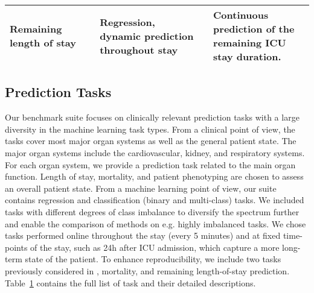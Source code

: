 \documentclass{article}
\begin{document}
\begin{table}[!hb]
\begin{tabular}{lll}
    Remaining length of stay & \makecell[l]{Regression, \\dynamic prediction throughout stay} & \makecell[l]{Continuous prediction of the \\ remaining ICU stay duration.}      \\
    \bottomrule
  \end{tabular}\label{tab:tasks}
\end{table}
\endgroup

\subsection{Prediction Tasks}\label{tasks}

Our benchmark suite focuses on clinically relevant prediction tasks with a large diversity in the machine learning task types. From a clinical point of view, the tasks cover most major organ systems as well as the general patient state. The major organ systems include the cardiovascular, kidney, and respiratory systems. For each organ system, we provide a prediction task related to the main organ function.
Length of stay, mortality, and patient phenotyping are chosen to assess an overall patient state.
From a machine learning point of view, our suite contains regression and classification (binary and multi-class) tasks. We included tasks with different degrees of class imbalance to diversify the spectrum further and enable the comparison of methods on e.g. highly imbalanced tasks. We chose tasks performed online throughout the stay (every 5 minutes) and at fixed time-points of the stay, such
as 24h after ICU admission, which capture a more long-term state of the patient.
To enhance reproducibility, we include two tasks previously considered in \cite{harutyunyan2019multitask}, mortality, and remaining length-of-stay prediction. Table~\ref{tab:tasks} contains the full list of task and their detailed descriptions.
\end{document}

